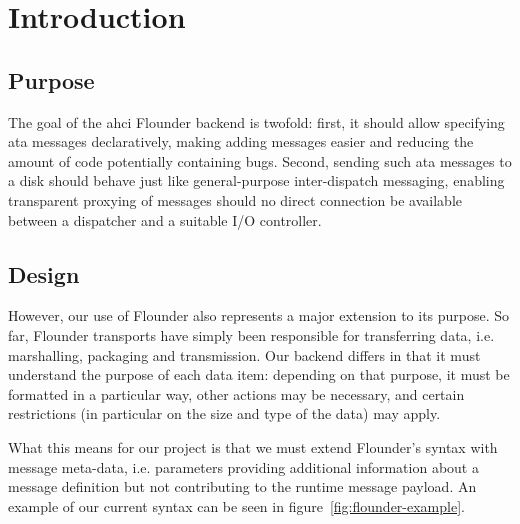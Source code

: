 
\section{Introduction}

\subsection{Purpose}

The goal of the \acs{ahci} Flounder backend is twofold: first, it should allow
specifying \ac{ata} messages declaratively, making adding messages easier and
reducing the amount of code potentially containing bugs. Second, sending such
\ac{ata} messages to a disk should behave just like general-purpose
inter-dispatch messaging, enabling transparent proxying of messages should no
direct connection be available between a dispatcher and a suitable I/O
controller.

\subsection{Design}

However, our use of Flounder also represents a major extension to its purpose.
So far, Flounder transports have simply been responsible for transferring data,
i.e. marshalling, packaging and transmission. Our backend differs in that it
must understand the purpose of each data item: depending on that purpose, it
must be formatted in a particular way, other actions may be necessary, and
certain restrictions (in particular on the size and type of the data) may
apply.

What this means for our project is that we must extend Flounder's syntax with
message meta-data, i.e. parameters providing additional information about a
message definition but not contributing to the runtime message payload. An
example of our current syntax can be seen in figure~\ref{fig:flounder-example}.

